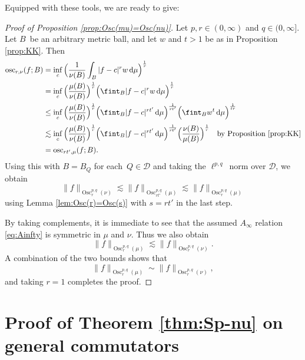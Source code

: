 \documentclass[reqno]{amsart}
\newcommand{\ud}[0]{\,\mathrm{d}}
\newcommand{\abs}[1]{|#1|}
\newcommand{\Norm}[2]{\|#1\|_{#2}}
\theoremstyle{plain}
\theoremstyle{definition}
\theoremstyle{remark}
\begin{document}
Equipped with these tools, we are ready to give:

\begin{proof}[Proof of Proposition \ref{prop:Osc(mu)=Osc(nu)}]
Let $p,r\in(0,\infty)$ and $q\in(0,\infty]$.
Let $B$ be an arbitrary metric ball, and let $w$ and $t>1$ be as in Proposition \ref{prop:KK}. Then
\begin{equation*}
\begin{split}
  \operatorname{osc}_{r,\nu}(f;B)
  &=\inf_c\Big(\frac{1}{\nu(B)}\int_{B}\abs{f-c}^r w\ud\mu\Big)^{\frac1r} \\
  &=\inf_c\Big(\frac{\mu(B)}{\nu(B)}\Big)^{\frac1r}\Big(\fint_{B}\abs{f-c}^r w\ud\mu\Big)^{\frac1r} \\
  &\leq\inf_c\Big(\frac{\mu(B)}{\nu(B)}\Big)^{\frac1r}\Big(\fint_{B}\abs{f-c}^{rt'}\ud\mu\Big)^{\frac{1}{rt'}}
     \Big(\fint_{B} w^t\ud\mu\Big)^{\frac{1}{tr}} \\
  &\lesssim\inf_c\Big(\frac{\mu(B)}{\nu(B)}\Big)^{\frac1r}\Big(\fint_{B}\abs{f-c}^{rt'}\ud\mu\Big)^{\frac{1}{rt'}}
     \Big(\frac{\nu(B)}{\mu(B)}\Big)^{\frac1r}
     \quad\text{by Proposition \ref{prop:KK}} \\
   &=\operatorname{osc}_{rt',\mu}(f;B).
\end{split}
\end{equation*}
Using this with $B=B_Q$ for each $Q\in\mathscr D$ and taking the $\ell^{p,q}$ norm over $\mathscr D$, we obtain
\begin{equation*}
  \Norm{f}{\operatorname{Osc}^{p,q}_r(\nu)}
  \lesssim\Norm{f}{\operatorname{Osc}^{p,q}_{rt'}(\mu)}
  \lesssim\Norm{f}{\operatorname{Osc}^{p,q}_{r}(\mu)}
\end{equation*}
using Lemma \ref{lem:Osc(r)=Osc(s)} with $s=rt'$ in the last step.

By taking complements, it is immediate to see that the assumed $A_\infty$ relation \eqref{eq:Ainfty} is symmetric in $\mu$ and $\nu$. Thus we also obtain
\begin{equation*}
  \Norm{f}{\operatorname{Osc}^{p,q}_r(\mu)}
  \lesssim\Norm{f}{\operatorname{Osc}^{p,q}_{r}(\nu)}.
\end{equation*}
A combination of the two bounds shows that
\begin{equation*}
  \Norm{f}{\operatorname{Osc}^{p,q}_r(\mu)}\sim\Norm{f}{\operatorname{Osc}^{p,q}_r(\nu)},
\end{equation*}
and taking $r=1$ completes the proof.
\end{proof}


\section{Proof of Theorem \ref{thm:Sp-nu} on general commutators}\label{sec:Sp-nu}
\end{document}
